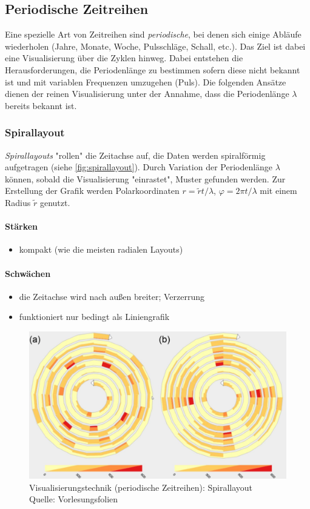 		\subsection{Periodische Zeitreihen}
			Eine spezielle Art von Zeitreihen sind \emph{periodische}, bei denen sich einige Abläufe wiederholen (\zB Jahre, Monate, Woche, Pulsschläge, Schall, etc.). Das Ziel ist dabei eine Visualisierung über die Zyklen hinweg. Dabei entstehen die Herausforderungen, die Periodenlänge zu bestimmen sofern diese nicht bekannt ist und mit variablen Frequenzen umzugehen (\bspw Puls). Die folgenden Ansätze dienen der reinen Visualisierung unter der Annahme, dass die Periodenlänge \(\lambda\) bereits bekannt ist.

			\subsubsection{Spirallayout}
				\emph{Spirallayouts} "rollen" die Zeitachse auf, \dh die Daten werden spiralförmig aufgetragen (siehe \autoref{fig:spirallayout}). Durch Variation der Periodenlänge \(\lambda\) können, sobald die Visualisierung "einrastet", Muster gefunden werden. Zur Erstellung der Grafik werden Polarkoordinaten \( r = \tilde{r} t / \lambda \), \( \varphi = 2 \pi t / \lambda \) mit einem Radius \(\tilde{r}\) genutzt.

				\paragraph{Stärken}
				\begin{itemize}
					\item kompakt (wie die meisten radialen Layouts)
				\end{itemize}

				\paragraph{Schwächen}
				\begin{itemize}
					\item die Zeitachse wird nach außen breiter; Verzerrung
					\item funktioniert nur bedingt als Liniengrafik
				\end{itemize}

				\begin{figure}
					\centering
					\includegraphics[width=0.5\linewidth]{spirallayout}
					\caption[Visualisierungstechnik (periodische Zeitreihen): Spirallayout]{Visualisierungstechnik (periodische Zeitreihen): Spirallayout\\Quelle: Vorlesungsfolien}
					\label{fig:spirallayout}
				\end{figure}

